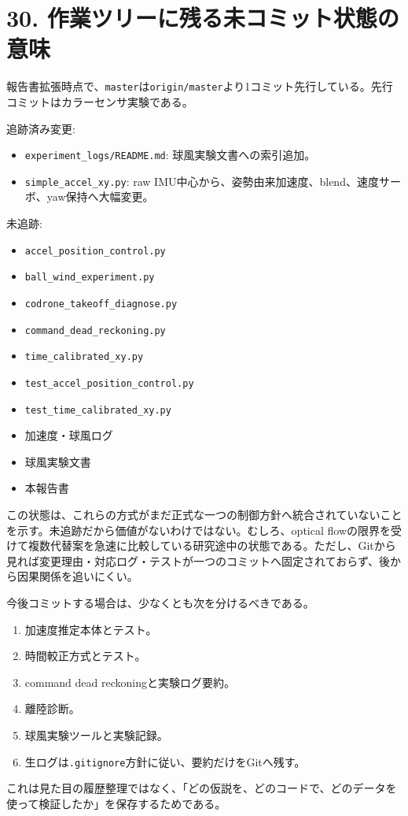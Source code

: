 \documentclass[10pt,a4paper,openany]{ltjsbook}
\begin{document}
\chapter{30. 作業ツリーに残る未コミット状態の意味}
報告書拡張時点で、\texttt{master}は\texttt{origin/master}より1コミット先行している。先行コミットはカラーセンサ実験である。\par
追跡済み変更:\par
\begin{itemize}
\item \texttt{experiment\_logs/README.md}: 球風実験文書への索引追加。
\item \texttt{simple\_accel\_xy.py}: raw IMU中心から、姿勢由来加速度、blend、速度サーボ、yaw保持へ大幅変更。
\end{itemize}
未追跡:\par
\begin{itemize}
\item \texttt{accel\_position\_control.py}
\item \texttt{ball\_wind\_experiment.py}
\item \texttt{codrone\_takeoff\_diagnose.py}
\item \texttt{command\_dead\_reckoning.py}
\item \texttt{time\_calibrated\_xy.py}
\item \texttt{test\_accel\_position\_control.py}
\item \texttt{test\_time\_calibrated\_xy.py}
\item 加速度・球風ログ
\item 球風実験文書
\item 本報告書
\end{itemize}
この状態は、これらの方式がまだ正式な一つの制御方針へ統合されていないことを示す。未追跡だから価値がないわけではない。むしろ、optical flowの限界を受けて複数代替案を急速に比較している研究途中の状態である。ただし、Gitから見れば変更理由・対応ログ・テストが一つのコミットへ固定されておらず、後から因果関係を追いにくい。\par
今後コミットする場合は、少なくとも次を分けるべきである。\par
\begin{enumerate}
\item 加速度推定本体とテスト。
\item 時間較正方式とテスト。
\item command dead reckoningと実験ログ要約。
\item 離陸診断。
\item 球風実験ツールと実験記録。
\item 生ログは\texttt{.gitignore}方針に従い、要約だけをGitへ残す。
\end{enumerate}
これは見た目の履歴整理ではなく、「どの仮説を、どのコードで、どのデータを使って検証したか」を保存するためである。\par
\end{document}
